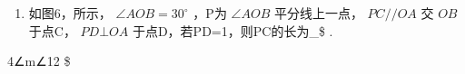 \begin{enumerate}
\def\labelenumi{\arabic{enumi}.}
\setcounter{enumi}{13}
\tightlist
\item
  如图6，所示， \(\angle A O B = 30 ^ { \circ }\) ，P为 \(\angle A O B\)
  平分线上一点， \(P C / / O A\) 交 \(O B\) 于点C， \(P D \bot O A\)
  于点D，若PD=1，则PC的长为\_\$ .
\end{enumerate}

4∠m∠12 \$
